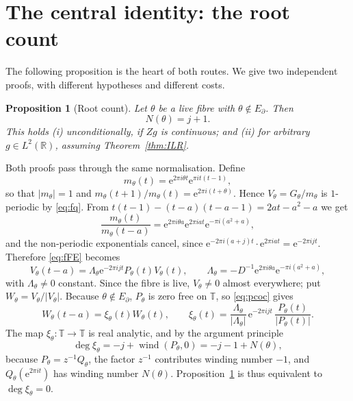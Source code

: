 \documentclass[11pt]{amsart}
\newtheorem{proposition}[theorem]{Proposition}
\theoremstyle{remark}
\newcommand{\R}{\mathbb R}
\newcommand{\T}{\mathbb T}
\newcommand{\e}{\mathrm e}
\DeclareMathOperator{\wind}{wind}
\DeclareMathOperator{\dg}{deg}
\begin{document}
\section{The central identity: the root count}\label{sec:degree}

The following proposition is the heart of both routes. We give two independent proofs, with
different hypotheses and different costs.

\begin{proposition}[Root count]\label{prop:count}
Let $\theta$ be a live fibre with $\theta\notin E_\partial$. Then
\[
N(\theta)=j+1 .
\]
This holds (i) unconditionally, if $Zg$ is continuous; and (ii) for arbitrary $g\in L^2(\R)$,
assuming Theorem~\ref{thm:ILR}.
\end{proposition}

Both proofs pass through the same normalisation. Define
\begin{equation}\label{eq:m}
m_\theta(t)=\e^{2\pi i\theta t}\e^{\pi it(t-1)} ,
\end{equation}
so that $|m_\theta|=1$ and $m_\theta(t+1)/m_\theta(t)=\e^{2\pi i(t+\theta)}$. Hence
$V_\theta=G_\theta/m_\theta$ is $1$-periodic by \eqref{eq:fq}. From
$t(t-1)-(t-a)(t-a-1)=2at-a^2-a$ we get
\[
\frac{m_\theta(t)}{m_\theta(t-a)}=\e^{2\pi i\theta a}\e^{2\pi iat}\e^{-\pi i(a^2+a)} ,
\]
and the non-periodic exponentials cancel, since
$\e^{-2\pi i(a+j)t}\cdot\e^{2\pi iat}=\e^{-2\pi ijt}$. Therefore \eqref{eq:fFE} becomes
\begin{equation}\label{eq:pcoc}
V_\theta(t-a)=\Lambda_\theta\e^{-2\pi ijt}P_\theta(t)V_\theta(t),
\qquad \Lambda_\theta=-D^{-1}\e^{2\pi i\theta a}\e^{-\pi i(a^2+a)} ,
\end{equation}
with $\Lambda_\theta\neq0$ constant. Since the fibre is live, $V_\theta\neq0$ almost
everywhere; put $W_\theta=V_\theta/|V_\theta|$. Because $\theta\notin E_\partial$, $P_\theta$
is zero free on $\T$, so \eqref{eq:pcoc} gives
\begin{equation}\label{eq:phcoc}
W_\theta(t-a)=\xi_\theta(t)W_\theta(t),\qquad
\xi_\theta(t)=\frac{\Lambda_\theta}{|\Lambda_\theta|}\,\e^{-2\pi ijt}\,
\frac{P_\theta(t)}{|P_\theta(t)|} .
\end{equation}
The map $\xi_\theta:\T\to\T$ is real analytic, and by the argument principle
\begin{equation}\label{eq:deg}
\dg\xi_\theta=-j+\wind(P_\theta,0)=-j-1+N(\theta) ,
\end{equation}
because $P_\theta=z^{-1}Q_\theta$, the factor $z^{-1}$ contributes winding number $-1$, and
$Q_\theta(\e^{2\pi it})$ has winding number $N(\theta)$. Proposition~\ref{prop:count} is thus
equivalent to $\dg\xi_\theta=0$.
\end{document}
